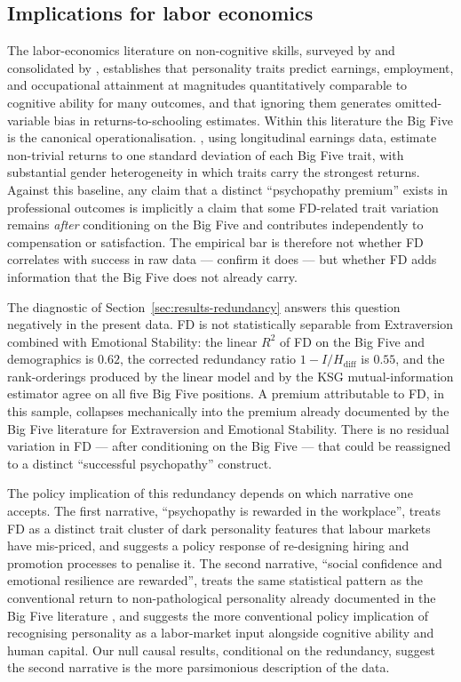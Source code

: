 \documentclass[11pt,a4paper]{article}
\begin{document}
\subsection{Implications for labor economics}

The labor-economics literature on non-cognitive skills, surveyed by
\citet{borghans2008} and consolidated by \citet{heckman2012},
establishes that personality traits predict earnings, employment,
and occupational attainment at magnitudes quantitatively comparable
to cognitive ability for many outcomes, and that ignoring them
generates omitted-variable bias in returns-to-schooling estimates.
Within this literature the Big Five is the canonical
operationalisation. \citet{mueller2006}, using longitudinal earnings
data, estimate non-trivial returns to one standard deviation of each
Big Five trait, with substantial gender heterogeneity in which traits
carry the strongest returns. Against this baseline, any claim that a
distinct ``psychopathy premium'' exists in professional outcomes is
implicitly a claim that some FD-related trait variation remains
\emph{after} conditioning on the Big Five and contributes
independently to compensation or satisfaction. The empirical bar is
therefore not whether FD correlates with success in raw data ---
\citet{eisenbarth2018} confirm it does --- but whether FD adds
information that the Big Five does not already carry.

The diagnostic of Section~\ref{sec:results-redundancy} answers this
question negatively in the present data. FD is not statistically
separable from Extraversion combined with Emotional Stability: the
linear $R^2$ of FD on the Big Five and demographics is $0.62$, the
corrected redundancy ratio $1 - I/H_{\text{diff}}$ is $0.55$, and
the rank-orderings produced by the linear model and by the KSG
mutual-information estimator agree on all five Big Five positions.
A premium attributable to FD, in this sample, collapses mechanically
into the premium already documented by the Big Five literature for
Extraversion and Emotional Stability. There is no residual variation
in FD --- after conditioning on the Big Five --- that could be
reassigned to a distinct ``successful psychopathy'' construct.

The policy implication of this redundancy depends on which narrative
one accepts. The first narrative, ``psychopathy is rewarded in the
workplace'', treats FD as a distinct trait cluster of dark
personality features that labour markets have mis-priced, and
suggests a policy response of re-designing hiring and promotion
processes to penalise it. The second narrative, ``social confidence
and emotional resilience are rewarded'', treats the same statistical
pattern as the conventional return to non-pathological personality
already documented in the Big Five literature
\citep{borghans2008,mueller2006}, and suggests the more conventional
policy implication of recognising personality as a labor-market input
alongside cognitive ability and human capital. Our null causal
results, conditional on the redundancy, suggest the second narrative
is the more parsimonious description of the data.
\end{document}
